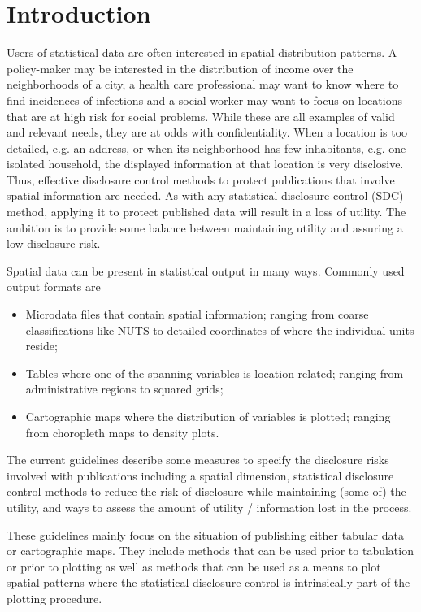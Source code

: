 \chapter{Introduction} \label{sec:intro}
Users of statistical data are often interested in spatial distribution patterns. A policy-maker may be interested in the distribution of income over the neighborhoods of a city, a health care professional may want to know where to find incidences of infections and a social worker may want to focus on locations that are at high risk for social problems. While these are all examples of valid and relevant needs, they are at odds with confidentiality. When a location is too detailed, e.g. an address, or when its neighborhood has few inhabitants, e.g. one isolated household, the displayed information at that location is very disclosive. Thus, effective disclosure control methods to protect publications that involve spatial information are needed. As with any statistical disclosure control (SDC) method, applying it to protect published data will result in a loss of utility. The ambition is to provide some balance between maintaining utility and assuring a low disclosure risk. 

Spatial data can be present in statistical output in many ways. Commonly used output formats are
\begin{itemize}
    \item Microdata files that contain spatial information; ranging from coarse classifications like NUTS to detailed coordinates of where the individual units reside;
    \item Tables where one of the spanning variables is location-related; ranging from administrative regions to squared grids;
    \item Cartographic maps where the distribution of variables is plotted; ranging from choropleth maps to density plots.
\end{itemize}

The current guidelines describe some measures to specify the disclosure risks involved with publications including a spatial dimension, statistical disclosure control methods to reduce the risk of disclosure while maintaining (some of) the utility, and ways to assess the amount of utility / information lost in the process.

These guidelines mainly focus on the situation of publishing either tabular data or cartographic maps. They include methods that can be used prior to tabulation or prior to plotting as well as methods that can be used as a means to plot spatial patterns where the statistical disclosure control is intrinsically part of the plotting procedure.\bigskip

